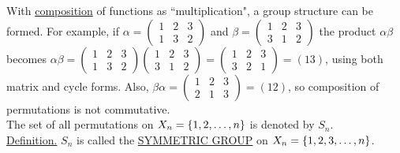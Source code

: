 \documentclass[12pt]{book}
\theoremstyle{definition}
\begin{document}
With \underline{composition} of functions as ``multiplication", a group structure can be formed. For example, if $ \alpha=\begin{pmatrix} 
1 & 2 & 3  \\
1 & 3 & 2  
\end{pmatrix}  $ and $ \beta= \begin{pmatrix} 
1 & 2 & 3  \\
3 & 1 & 2  
\end{pmatrix} $ the product $ \alpha\beta $ becomes $ \alpha\beta= \begin{pmatrix} 
1 & 2 & 3  \\
1 & 3 & 2  
\end{pmatrix} \begin{pmatrix} 
1 & 2 & 3  \\
3 & 1 & 2  
\end{pmatrix}= \begin{pmatrix} 
1 & 2 & 3  \\
3& 2 & 1  
\end{pmatrix}=(13)$, using both matrix and cycle forms. Also, $ \beta\alpha=\begin{pmatrix} 
1 & 2 & 3  \\
2 & 1 & 3  
\end{pmatrix}=(12) $, so composition of permutations is not commutative.\\

The set of all permutations on $ X_n=\{1,2,\text{\dots},n\} $ is denoted by $ S_n $.\\[.2in]
\underline{Definition.} $ S_n $ is called the \underline{SYMMETRIC GROUP}  on $ X_n=\{1,2,3,\text{\dots}, n\} $.
\end{document}
